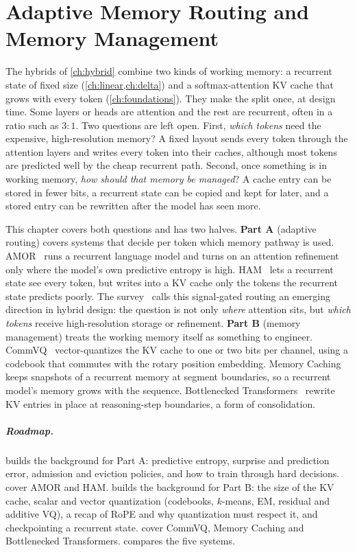 \chapter{Adaptive Memory Routing and Memory Management}\label{ch:routing}

The hybrids of \cref{ch:hybrid} combine two kinds of working memory: a recurrent state of fixed size
(\cref{ch:linear,ch:delta}) and a softmax-attention KV cache that grows with every token
(\cref{ch:foundations}). They make the split once, at design time. Some layers or heads are attention
and the rest are recurrent, often in a ratio such as $3{:}1$. Two questions are left open. First,
\emph{which tokens} need the expensive, high-resolution memory? A fixed layout sends every token
through the attention layers and writes every token into their caches, although most tokens are
predicted well by the cheap recurrent path. Second, once something is in working memory, \emph{how
should that memory be managed}? A cache entry can be stored in fewer bits, a recurrent state can be
copied and kept for later, and a stored entry can be rewritten after the model has seen more.

This chapter covers both questions and has two halves. \textbf{Part A} (adaptive routing) covers
systems that decide per token which memory pathway is used. AMOR~\citep{zheng2026amor} runs a
recurrent language model and turns on an attention refinement only where the model's own predictive
entropy is high. HAM~\citep{lufkin2026ham} lets a recurrent state see every token, but writes into a
KV cache only the tokens the recurrent state predicts poorly. The survey~\citep{zhoubian2026memory}
calls this signal-gated routing an emerging direction in hybrid design: the question is not only
\emph{where} attention sits, but \emph{which tokens} receive high-resolution storage or refinement.
\textbf{Part B} (memory management) treats the working memory itself as something to engineer.
CommVQ~\citep{li2025commvq} vector-quantizes the KV cache to one or two bits per channel, using a
codebook that commutes with the rotary position embedding. Memory Caching~\citep{behrouz2026memorycaching}
keeps snapshots of a recurrent memory at segment boundaries, so a recurrent model's memory grows
with the sequence. Bottlenecked Transformers~\citep{oomerjee2026bottlenecked} rewrite KV entries in
place at reasoning-step boundaries, a form of consolidation.

\paragraph{Roadmap.}  builds the background for Part A: predictive entropy,
surprise and prediction error, admission and eviction policies, and how to train through hard
decisions.  cover AMOR and HAM.  builds the
background for Part B: the size of the KV cache, scalar and vector quantization (codebooks, $k$-means,
EM, residual and additive VQ), a recap of RoPE and why quantization must respect it, and
checkpointing a recurrent state.  cover CommVQ,
Memory Caching and Bottlenecked Transformers.  compares the five systems.

